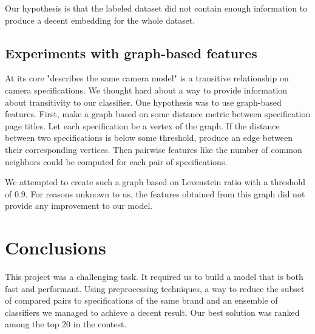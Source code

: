 \documentclass[sigconf]{acmart}
\begin{document}
Our hypothesis is that the labeled dataset did not contain enough information to produce a decent embedding for the whole dataset.

\subsection{Experiments with graph-based features}

At its core "describes the same camera model" is a transitive relationship on camera specifications. We thought hard about a way to provide information about transitivity to our classifier. One hypothesis was to use graph-based features. First, make a graph based on some distance metric between specification page titles. Let each specification be a vertex of the graph. If the distance between two specifications is below some threshold, produce an edge between their corresponding vertices. Then pairwise features like the number of common neighbors could be computed for each pair of specifications.

We attempted to create such a graph based on Levenstein ratio with a threshold of $0.9$. For reasons unknown to us, the features obtained from this graph did not provide any improvement to our model.

\section{Conclusions}

This project was a challenging task. It required us to build a model that is both fast and performant. Using preprocessing techniques, a way to reduce the subset of compared pairs to specifications of the same brand and an ensemble of classifiers we managed to achieve a decent result. Our best solution was ranked among the top 20 in the contest.




\end{document}
